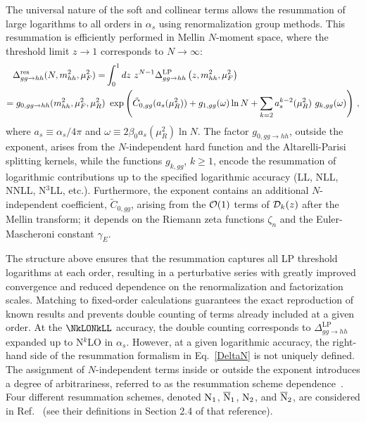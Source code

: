 The universal nature of the soft and collinear terms allows the resummation of large logarithms to all orders in $\alpha_s$ using renormalization group methods. This resummation is efficiently performed in Mellin $N$-moment space, where the threshold limit $z\rightarrow 1$ corresponds to $N\rightarrow \infty$:
\begin{align}
    \Delta_{gg\rightarrow hh}^{\rm res}(N,m_{hh}^2,\mu_F^2) =&  \int_0^1 dz ~z^{N-1}\Delta^{\text{LP}}_{gg\rightarrow hh}\left(z,m_{hh}^2,\mu_F^2\right)
    \nonumber \\
    =  g_{0,gg\to hh}(m_{hh}^2,\mu_F^2,\mu_R^2)
    & 
    ~\exp \left(\tilde{C}_{0,gg} (a_s(\mu_R^2)) + g_{1,gg} (\omega)\ln N + \sum_{k=2}{a_s^{k-2}(\mu_R^2)~g_{k,gg} (\omega)}\right)\,,
    \label{DeltaN}
\end{align}
where $a_s\equiv \alpha_s/4\pi$ and $\omega \equiv 2 \beta_0 a_s(\mu_R^2) \ln N$. The factor $g_{0,gg\to hh}$, outside the exponent, arises from the $N$-independent hard function and the Altarelli-Parisi splitting kernels, while the functions $g_{k,gg}$, $k\ge 1$, encode the resummation of logarithmic contributions up to the specified logarithmic accuracy (LL, NLL, NNLL, N$^3$LL, etc.).
Furthermore, the exponent contains an additional $N$-independent coefficient, $\tilde{C}_{0,gg}$, arising from the ${\cal O}(1)$ terms of ${\cal D}_k(z)$ after the Mellin transform; it depends on the Riemann zeta functions $\zeta_n$ and the Euler-Mascheroni constant $\gamma_E$. 

The structure above ensures that the resummation captures all LP threshold logarithms at each order, resulting in a perturbative series with greatly improved convergence and reduced dependence on the renormalization and factorization scales. Matching to fixed-order calculations guarantees the exact reproduction of known results and prevents double counting of terms already included at a given order. At the $\NkLONkLL$ accuracy, the double counting corresponds to $\Delta^{\text{LP}}_{gg\to hh}$ expanded up to N$^k$LO in $\alpha_s$. However, at a given logarithmic accuracy, the right-hand side of the resummation formalism in Eq.~\eqref{DeltaN} is not uniquely defined. The assignment of $N$-independent terms inside or outside the exponent introduces a degree of arbitrariness, referred to as the resummation scheme dependence~\cite{Ajjath:2022kpv}. Four different resummation schemes, denoted ${\rm N_1}$, $\rm{\overline N}_1$, ${\rm N_2}$, and $\rm{\overline N}_2$, are considered in Ref.~\cite{Ajjath:2022kpv} (see their definitions in Section 2.4 of that reference).

